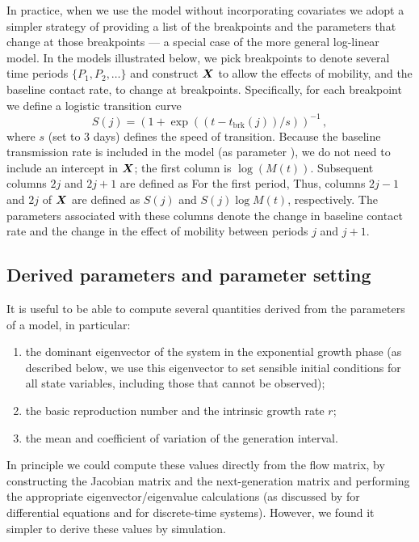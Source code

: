 \documentclass[12pt]{article}\usepackage[]{graphicx}\usepackage[]{color}
\begin{document}
In practice, when we use the model without incorporating covariates we adopt a simpler strategy of providing a list of the breakpoints and the parameters that change at those breakpoints --- a special case of the more general log-linear model. In the models illustrated below, we pick breakpoints to denote several time periods $\{P_1, P_2, \ldots\}$ and construct $\boldsymbol{X}$ to allow the effects of mobility, and the baseline contact rate, to change at breakpoints.
Specifically, for each breakpoint we define a logistic transition curve 
\begin{equation}
S(j) = (1+\exp((t-t_\textrm{brk}(j))/s))^{-1} \,,
\end{equation}
where $s$ (set to 3 days) defines the speed of transition. Because the baseline transmission rate is included in the model (as parameter ), we do not need to include an intercept in $\boldsymbol{X}$; the first column is $\log(M(t))$. Subsequent columns $2j$ and $2j+1$ are defined as
For the first period, 
Thus, columns $2j-1$ and $2j$ of $\boldsymbol{X}$ are defined as $S(j)$ and $S(j) \log M(t)$, respectively. The parameters associated with these columns denote the change in baseline contact rate and the change in the effect of mobility between periods $j$ and $j+1$.
  
\subsection*{Derived parameters and parameter setting}

It is useful to be able to compute several quantities derived from the parameters of a model, in particular:
\begin{enumerate}
\item the dominant eigenvector of the system in the exponential growth phase
  (as described below, we use this eigenvector to set sensible initial conditions for all state variables, including those that cannot be observed);
\item the basic reproduction number \Rzero and the intrinsic growth rate $r$;
\item the mean and coefficient of variation of the generation interval. 
\end{enumerate}
In principle we could compute these values directly from the flow matrix, by constructing the Jacobian matrix and the next-generation matrix and performing the appropriate eigenvector/eigenvalue calculations (as discussed by \cite{VandWatm02} for differential equations and \cite{Casw00} for discrete-time systems). However, we found it simpler to derive these values by simulation.
\end{document}
